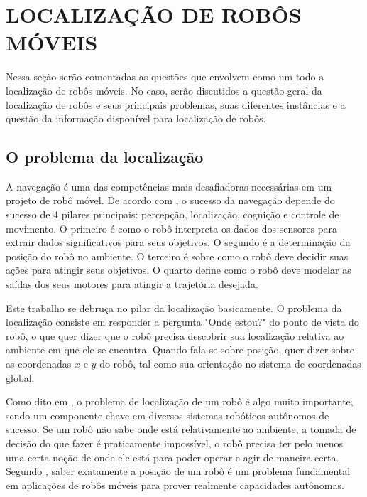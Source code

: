 \documentclass[acronym, symbols, table]{fei}
\begin{document}
	\chapter{LOCALIZAÇÃO DE ROBÔS MÓVEIS}\label{sec:chapter_localizacao_robos_moveis}
	
		Nessa seção serão comentadas as questões que envolvem como um todo a localização de robôs móveis. No caso, serão discutidos a questão geral da localização de robôs e seus principais problemas, suas diferentes instâncias e a questão da informação disponível para localização de robôs.
		
		\section{O problema da localização}
		
			A navegação é uma das competências mais desafiadoras necessárias em um projeto de robô móvel. De acordo com \textcite{siegwart2011introduction}, o sucesso da navegação depende do sucesso de 4 pilares principais: percepção, localização, cognição e controle de movimento. O primeiro é como o robô interpreta os dados dos sensores para extrair dados significativos para seus objetivos. O segundo é a determinação da posição do robô no ambiente. O terceiro é sobre como o robô deve decidir suas ações para atingir seus objetivos. O quarto define como o robô deve modelar as saídas dos seus motores para atingir a trajetória desejada.
			
			Este trabalho se debruça no pilar da localização basicamente. O problema da localização consiste em responder a pergunta "Onde estou?" do ponto de vista do robô, o que quer dizer que o robô precisa descobrir sua localização relativa ao ambiente em que ele se encontra. Quando fala-se sobre posição, quer dizer sobre as coordenadas $x$ e $y$ do robô, tal como sua orientação no sistema de coordenadas global.
			
			Como dito em \textcite{thrun2001robust}, o problema de localização de um robô é algo muito importante, sendo um componente chave em diversos sistemas robóticos autônomos de sucesso. Se um robô não sabe onde está relativamente ao ambiente, a tomada de decisão do que fazer é praticamente impossível, o robô precisa ter pelo menos uma certa noção de onde ele está para poder operar e agir de maneira certa. Segundo \textcite{borenstein1997mobile}, saber exatamente a posição de um robô é um problema fundamental em aplicações de robôs móveis para prover realmente capacidades autônomas.
			
\end{document}
